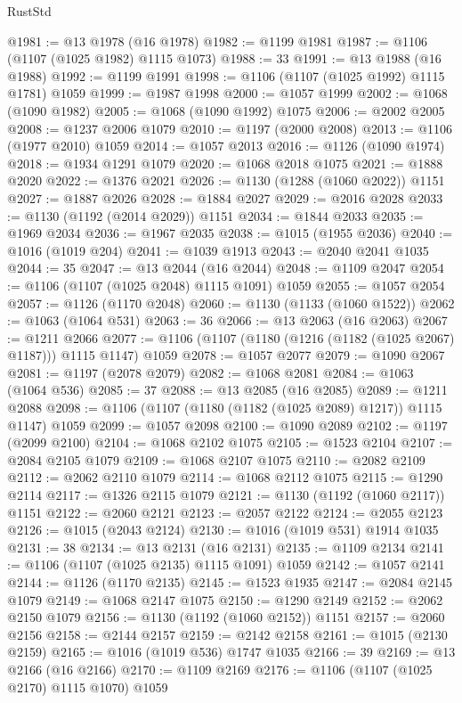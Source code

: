 \begin{lexlean}{RustStd}
\begin{coremodule}
@1981 := @13 @1978 (@16 @1978)
@1982 := @1199 @1981
@1987 := @1106 (@1107 (@1025 @1982) @1115 @1073)
@1988 := 33
@1991 := @13 @1988 (@16 @1988)
@1992 := @1199 @1991
@1998 := @1106 (@1107 (@1025 @1992) @1115 @1781) @1059
@1999 := @1987 @1998
@2000 := @1057 @1999
@2002 := @1068 (@1090 @1982)
@2005 := @1068 (@1090 @1992) @1075
@2006 := @2002 @2005
@2008 := @1237 @2006 @1079
@2010 := @1197 (@2000 @2008)
@2013 := @1106 (@1977 @2010) @1059
@2014 := @1057 @2013
@2016 := @1126 (@1090 @1974)
@2018 := @1934 @1291 @1079
@2020 := @1068 @2018 @1075
@2021 := @1888 @2020
@2022 := @1376 @2021
@2026 := @1130 (@1288 (@1060 @2022)) @1151
@2027 := @1887 @2026
@2028 := @1884 @2027
@2029 := @2016 @2028
@2033 := @1130 (@1192 (@2014 @2029)) @1151
@2034 := @1844 @2033
@2035 := @1969 @2034
@2036 := @1967 @2035
@2038 := @1015 (@1955 @2036)
@2040 := @1016 (@1019 @204)
@2041 := @1039 @1913
@2043 := @2040 @2041 @1035
@2044 := 35
@2047 := @13 @2044 (@16 @2044)
@2048 := @1109 @2047
@2054 := @1106 (@1107 (@1025 @2048) @1115 @1091) @1059
@2055 := @1057 @2054
@2057 := @1126 (@1170 @2048)
@2060 := @1130 (@1133 (@1060 @1522))
@2062 := @1063 (@1064 @531)
@2063 := 36
@2066 := @13 @2063 (@16 @2063)
@2067 := @1211 @2066
@2077 := @1106 (@1107 (@1180 (@1216 (@1182 (@1025 @2067) @1187))) @1115 @1147) @1059
@2078 := @1057 @2077
@2079 := @1090 @2067
@2081 := @1197 (@2078 @2079)
@2082 := @1068 @2081
@2084 := @1063 (@1064 @536)
@2085 := 37
@2088 := @13 @2085 (@16 @2085)
@2089 := @1211 @2088
@2098 := @1106 (@1107 (@1180 (@1182 (@1025 @2089) @1217)) @1115 @1147) @1059
@2099 := @1057 @2098
@2100 := @1090 @2089
@2102 := @1197 (@2099 @2100)
@2104 := @1068 @2102 @1075
@2105 := @1523 @2104
@2107 := @2084 @2105 @1079
@2109 := @1068 @2107 @1075
@2110 := @2082 @2109
@2112 := @2062 @2110 @1079
@2114 := @1068 @2112 @1075
@2115 := @1290 @2114
@2117 := @1326 @2115 @1079
@2121 := @1130 (@1192 (@1060 @2117)) @1151
@2122 := @2060 @2121
@2123 := @2057 @2122
@2124 := @2055 @2123
@2126 := @1015 (@2043 @2124)
@2130 := @1016 (@1019 @531) @1914 @1035
@2131 := 38
@2134 := @13 @2131 (@16 @2131)
@2135 := @1109 @2134
@2141 := @1106 (@1107 (@1025 @2135) @1115 @1091) @1059
@2142 := @1057 @2141
@2144 := @1126 (@1170 @2135)
@2145 := @1523 @1935
@2147 := @2084 @2145 @1079
@2149 := @1068 @2147 @1075
@2150 := @1290 @2149
@2152 := @2062 @2150 @1079
@2156 := @1130 (@1192 (@1060 @2152)) @1151
@2157 := @2060 @2156
@2158 := @2144 @2157
@2159 := @2142 @2158
@2161 := @1015 (@2130 @2159)
@2165 := @1016 (@1019 @536) @1747 @1035
@2166 := 39
@2169 := @13 @2166 (@16 @2166)
@2170 := @1109 @2169
@2176 := @1106 (@1107 (@1025 @2170) @1115 @1070) @1059

\end{coremodule}
\end{lexlean}
